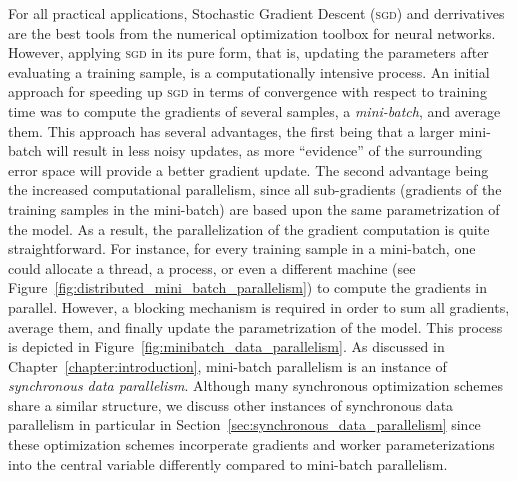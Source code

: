 For all practical applications, Stochastic Gradient Descent (\textsc{sgd}) and derrivatives are the best tools from the numerical optimization toolbox for neural networks. However, applying \textsc{sgd} in its pure form, that is, updating the parameters after evaluating a training sample, is a computationally intensive process. An initial approach for speeding up \textsc{sgd} in terms of convergence with respect to training time was to compute the gradients of several samples, a \emph{mini-batch}, and average them. This approach has several advantages, the first being that a larger mini-batch will result in less noisy updates, as more ``evidence'' of the surrounding error space will provide a better gradient update. The second advantage being the increased computational parallelism, since all sub-gradients (gradients of the training samples in the mini-batch) are based upon the same parametrization of the model. As a result, the parallelization of the gradient computation is quite straightforward. For instance, for every training sample in a mini-batch, one could allocate a thread, a process, or even a different machine (see Figure~\ref{fig:distributed_mini_batch_parallelism}) to compute the gradients in parallel. However, a blocking mechanism is required in order to sum all gradients, average them, and finally update the parametrization of the model. This process is depicted in Figure~\ref{fig:minibatch_data_parallelism}. As discussed in Chapter~\ref{chapter:introduction}, mini-batch parallelism is an instance of \emph{synchronous data parallelism}. Although many synchronous optimization schemes share a similar structure, we discuss other instances of synchronous data parallelism in particular in Section~\ref{sec:synchronous_data_parallelism} since these optimization schemes incorperate gradients and worker parameterizations into the central variable differently compared to mini-batch parallelism.\\

